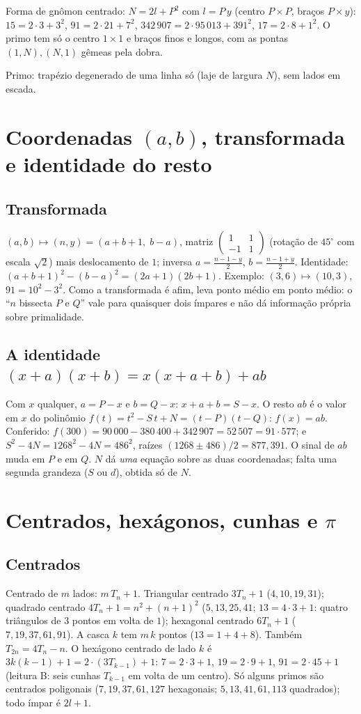 \documentclass[11pt,a4paper]{article}
\begin{document}
Forma de gnômon centrado: $N=2l+P^2$ com $l=P\,y$ (centro $P\times P$, braços $P\times y$): $15=2\cdot3+3^2$, $91=2\cdot21+7^2$, $342\,907=2\cdot95\,013+391^2$, $17=2\cdot8+1^2$. O primo tem só o centro $1\times1$ e braços finos e longos, com as pontas $(1,N),(N,1)$ gêmeas pela dobra.

Primo: trapézio degenerado de uma linha só (laje de largura $N$), sem lados em escada.

\section{Coordenadas $(a,b)$, transformada e identidade do resto}

\subsection{Transformada}
$(a,b)\mapsto(n,y)=(a+b+1,\;b-a)$, matriz $\begin{pmatrix}1&1\\-1&1\end{pmatrix}$ (rotação de $45^\circ$ com escala $\sqrt2$) mais deslocamento de $1$; inversa $a=\tfrac{n-1-y}{2}$, $b=\tfrac{n-1+y}{2}$. Identidade: $(a+b+1)^2-(b-a)^2=(2a+1)(2b+1)$. Exemplo: $(3,6)\mapsto(10,3)$, $91=10^2-3^2$. Como a transformada é afim, leva ponto médio em ponto médio: o ``$n$ bissecta $P$ e $Q$'' vale para quaisquer dois ímpares e não dá informação própria sobre primalidade.

\subsection{A identidade $(x+a)(x+b)=x(x+a+b)+ab$}
Com $x$ qualquer, $a=P-x$ e $b=Q-x$: $x+a+b=S-x$. O resto $ab$ é o valor em $x$ do polinômio $f(t)=t^2-S\,t+N=(t-P)(t-Q)$: $f(x)=ab$. Conferido: $f(300)=90\,000-380\,400+342\,907=52\,507=91\cdot577$; e $S^2-4N=1268^2-4N=486^2$, raízes $(1268\pm486)/2=877,391$. O sinal de $ab$ muda em $P$ e em $Q$. $N$ dá \emph{uma} equação sobre as duas coordenadas; falta uma segunda grandeza ($S$ ou $d$), obtida só de $N$.

\section{Centrados, hexágonos, cunhas e $\pi$}

\subsection{Centrados}
Centrado de $m$ lados: $m\,T_n+1$. Triangular centrado $3T_n+1$ ($4,10,19,31$); quadrado centrado $4T_n+1=n^2+(n+1)^2$ ($5,13,25,41$; $13=4\cdot3+1$: quatro triângulos de $3$ pontos em volta de $1$); hexagonal centrado $6T_n+1$ ($7,19,37,61,91$). A casca $k$ tem $m\,k$ pontos ($13=1+4+8$). Também $T_{2n}=4T_n-n$. O hexágono centrado de lado $k$ é $3k(k-1)+1=2\cdot(3T_{k-1})+1$: $7=2\cdot3+1$, $19=2\cdot9+1$, $91=2\cdot45+1$ (leitura B: seis cunhas $T_{k-1}$ em volta de um centro). Só alguns primos são centrados poligonais ($7,19,37,61,127$ hexagonais; $5,13,41,61,113$ quadrados); todo ímpar é $2l+1$.
\end{document}
